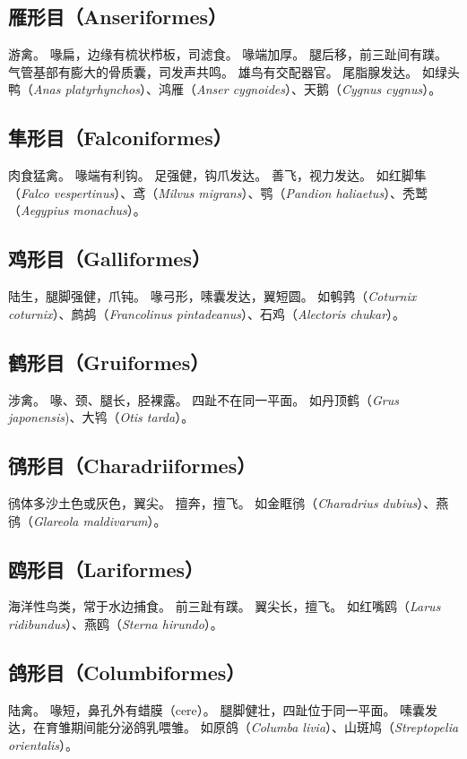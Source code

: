 \documentclass[11pt]{article}
\begin{document}
\subsection{雁形目（Anseriformes）}
游禽。
喙扁，边缘有梳状栉板，司滤食。
喙端加厚。
腿后移，前三趾间有蹼。
气管基部有膨大的骨质囊，司发声共鸣。
雄鸟有交配器官。
尾脂腺发达。
如绿头鸭（\textit{Anas platyrhynchos}）、鸿雁（\textit{Anser cygnoides}）、天鹅（\textit{Cygnus cygnus}）。

\subsection{隼形目（Falconiformes）}
肉食猛禽。
喙端有利钩。
足强健，钩爪发达。
善飞，视力发达。
如红脚隼（\textit{Falco vespertinus}）、鸢（\textit{Milvus migrans}）、鹗（\textit{Pandion haliaetus}）、秃鹫（\textit{Aegypius monachus}）。

\subsection{鸡形目（Galliformes）}
陆生，腿脚强健，爪钝。
喙弓形，嗉囊发达，翼短圆。
如鹌鹑（\textit{Coturnix coturnix}）、鹧鸪（\textit{Francolinus pintadeanus}）、石鸡（\textit{Alectoris chukar}）。

\subsection{鹤形目（Gruiformes）}
涉禽。
喙、颈、腿长，胫裸露。
四趾不在同一平面。
如丹顶鹤（\textit{Grus japonensis})、大鸨（\textit{Otis tarda}）。

\subsection{鸻形目（Charadriiformes）}
鸻体多沙土色或灰色，翼尖。
擅奔，擅飞。
如金眶鸻（\textit{Charadrius dubius}）、燕鸻（\textit{Glareola maldivarum}）。

\subsection{鸥形目（Lariformes）}
海洋性鸟类，常于水边捕食。
前三趾有蹼。
翼尖长，擅飞。
如红嘴鸥（\textit{Larus ridibundus}）、燕鸥（\textit{Sterna hirundo}）。

\subsection{鸽形目（Columbiformes）}
陆禽。
喙短，鼻孔外有蜡膜（cere）。
腿脚健壮，四趾位于同一平面。
嗉囊发达，在育雏期间能分泌鸽乳喂雏。
如原鸽（\textit{Columba livia}）、山斑鸠（\textit{Streptopelia orientalis}）。
\end{document}
